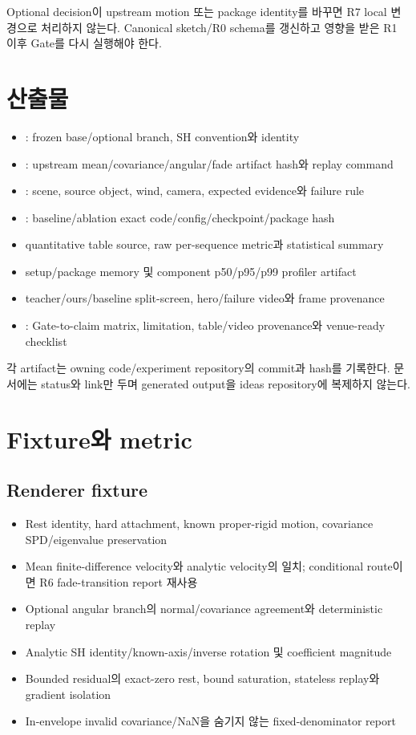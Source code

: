\documentclass[10pt]{article}
\begin{document}
Optional decision이 upstream motion 또는 package identity를 바꾸면 R7 local 변경으로 처리하지 않는다.
Canonical sketch/R0 schema를 갱신하고 영향을 받은 R1 이후 Gate를 다시 실행해야 한다.

\section{산출물}
\label{sec:r7-chapter-6}

\begin{itemize}
  \item {}: frozen base/optional branch, SH convention와 identity
  \item {}: upstream mean/covariance/angular/fade artifact hash와 replay command
  \item {}: scene, source object, wind, camera, expected evidence와 failure rule
  \item {}: baseline/ablation exact code/config/checkpoint/package hash
  \item quantitative table source, raw per-sequence metric과 statistical summary
  \item setup/package memory 및 component p50/p95/p99 profiler artifact
  \item teacher/ours/baseline split-screen, hero/failure video와 frame provenance
  \item {}: Gate-to-claim matrix, limitation, table/video provenance와 venue-ready checklist
\end{itemize}

각 artifact는 owning code/experiment repository의 commit과 hash를 기록한다. 문서에는 status와 link만 두며
generated output을 ideas repository에 복제하지 않는다.

\section{Fixture와 metric}
\label{sec:r7-chapter-7}

\subsection{Renderer fixture}

\begin{itemize}
  \item Rest identity, hard attachment, known proper-rigid motion, covariance SPD/eigenvalue preservation
  \item Mean finite-difference velocity와 analytic velocity의 일치; conditional route이면 R6 fade-transition report 재사용
  \item Optional angular branch의 normal/covariance agreement와 deterministic replay
  \item Analytic SH identity/known-axis/inverse rotation 및 coefficient magnitude
  \item Bounded residual의 exact-zero rest, bound saturation, stateless replay와 gradient isolation
  \item In-envelope invalid covariance/NaN을 숨기지 않는 fixed-denominator report
\end{itemize}
\end{document}
